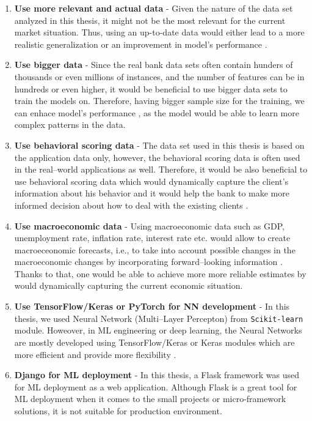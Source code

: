 \begin{enumerate}\setlength\itemsep{0em}
    \item \textbf{Use more relevant and actual data} - Given the nature of the data set analyzed in this thesis, it might not be the most relevant for the current market situation. Thus, using an up-to-date data would either lead to a more realistic generalization \citep {kumar2021blockchain} or an improvement in model's performance \citep{karatas2020increasing}.
    \item \textbf{Use bigger data} - Since the real bank data sets often contain hunders of thousands or even millions of instances, and the number of features can be in hundreds or even higher, it would be beneficial to use bigger data sets to train the models on. Therefore, having bigger sample size for the training, we can enhace model's performance \citep{ng2020influence}, as the model would be able to learn more complex patterns in the data. 
    \item \textbf{Use behavioral scoring data} - The data set used in this thesis is based on the application data only, however, the behavioral scoring data is often used in the real--world applications as well. Therefore, it would be also beneficial to use behavioral scoring data which would dynamically capture the client's information about his behavior and it would help the bank to make more informed decision about how to deal with the existing clients \citep{li2012overview}.
    \item \textbf{Use macroeconomic data} - Using macroeconomic data such as GDP, unemployment rate, inflation rate, interest rate etc. would allow to create macroeceonomic forecasts, i.e., to take into account possible changes in the macroeconomic changes by incorporating forward--looking information \citep{jakubik2007macroeconomic}.
    Thanks to that, one would be able to achieve more more reliable estimates by would dynamically capturing the current economic situation.
    \item \textbf{Use TensorFlow/Keras or PyTorch for NN development} - In this thesis, we used Neural Network (Multi--Layer Percepton) from \lstinline{Scikit-learn} module. Howeover, in ML engineering or deep learning, the Neural Networks are mostly developed using TensorFlow/Keras or Keras modules which are more efficient and provide more flexibility \citep{gevorkyan2019review}.
    \item \textbf{Django for ML deployment} - In this thesis, a Flask framework was used for ML deployment as a web application. Although Flask is a great tool for ML deployment when it comes to the small projects or micro-framework solutions, it is not suitable for production environment.

\end{enumerate}
